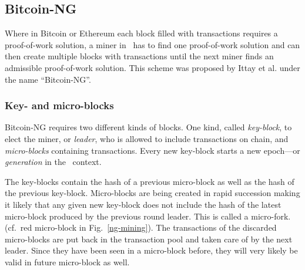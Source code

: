 
\subsection{Bitcoin-NG}

Where in Bitcoin or Ethereum each block filled with transactions requires
a proof-of-work solution, a miner in \aet\ has to find one proof-of-work
solution and can then create multiple blocks with transactions until the next
miner finds an admissible proof-of-work solution. This scheme was proposed by
Ittay et al. \cite{Eyal:2016:BSB:2930611.2930615} under the name \enquote{Bitcoin-NG}.

\subsubsection{Key- and micro-blocks}

Bitcoin-NG requires two different kinds of blocks. One kind, called
\textit{key-block}, to elect the miner, or \textit{leader}, who is allowed to
include transactions on chain, and \textit{micro-blocks} containing
transactions. Every new key-block starts a new epoch---or \textit{generation}
in the \aet\ context.

The key-blocks contain the hash of a previous micro-block as well as the hash
of the previous key-block.
Micro-blocks are being created in rapid succession making it likely that any
given new key-block does not include the hash of the latest micro-block
produced by the previous round leader.
This is called a micro-fork. (cf.\ red micro-block in Fig.\
\ref{ng-mining}). The transactions of the discarded micro-blocks are put back
in the transaction pool and taken care of by the next leader. Since they have
been seen in a micro-block before, they will very likely be valid in
future micro-block as well.

